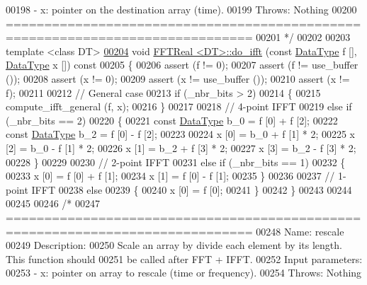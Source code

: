 \begin{DoxyCode}
00198 \textcolor{comment}{    - x: pointer on the destination array (time).}
00199 \textcolor{comment}{Throws: Nothing}
00200 \textcolor{comment}{==============================================================================}
00201 \textcolor{comment}{*/}
00202 
00203 \textcolor{keyword}{template} <\textcolor{keyword}{class} DT>
\hypertarget{a00096_source_l00204}{}\hyperlink{a00010_a8ab2e0da482cea88a61f01d58c074989}{00204} \textcolor{keywordtype}{void}    \hyperlink{a00010}{FFTReal <DT>::do\_ifft} (\textcolor{keyword}{const} \hyperlink{a00010_a606148f1cf8c3b7d705473932fc063d1}{DataType} f [], 
      \hyperlink{a00010_a606148f1cf8c3b7d705473932fc063d1}{DataType} x []) \textcolor{keyword}{const}
00205 \{
00206     assert (f != 0);
00207     assert (f != use\_buffer ());
00208     assert (x != 0);
00209     assert (x != use\_buffer ());
00210     assert (x != f);
00211 
00212     \textcolor{comment}{// General case}
00213     \textcolor{keywordflow}{if} (\_nbr\_bits > 2)
00214     \{
00215         compute\_ifft\_general (f, x);
00216     \}
00217 
00218     \textcolor{comment}{// 4-point IFFT}
00219     \textcolor{keywordflow}{else} \textcolor{keywordflow}{if} (\_nbr\_bits == 2)
00220     \{
00221         \textcolor{keyword}{const} \hyperlink{a00010_a606148f1cf8c3b7d705473932fc063d1}{DataType}  b\_0 = f [0] + f [2];
00222         \textcolor{keyword}{const} \hyperlink{a00010_a606148f1cf8c3b7d705473932fc063d1}{DataType}  b\_2 = f [0] - f [2];
00223 
00224         x [0] = b\_0 + f [1] * 2;
00225         x [2] = b\_0 - f [1] * 2;
00226         x [1] = b\_2 + f [3] * 2;
00227         x [3] = b\_2 - f [3] * 2;
00228     \}
00229 
00230     \textcolor{comment}{// 2-point IFFT}
00231     \textcolor{keywordflow}{else} \textcolor{keywordflow}{if} (\_nbr\_bits == 1)
00232     \{
00233         x [0] = f [0] + f [1];
00234         x [1] = f [0] - f [1];
00235     \}
00236 
00237     \textcolor{comment}{// 1-point IFFT}
00238     \textcolor{keywordflow}{else}
00239     \{
00240         x [0] = f [0];
00241     \}
00242 \}
00243 
00244 
00245 
00246 \textcolor{comment}{/*}
00247 \textcolor{comment}{==============================================================================}
00248 \textcolor{comment}{Name: rescale}
00249 \textcolor{comment}{Description:}
00250 \textcolor{comment}{    Scale an array by divide each element by its length. This function should}
00251 \textcolor{comment}{    be called after FFT + IFFT.}
00252 \textcolor{comment}{Input parameters:}
00253 \textcolor{comment}{    - x: pointer on array to rescale (time or frequency).}
00254 \textcolor{comment}{Throws: Nothing}

\end{DoxyCode}
